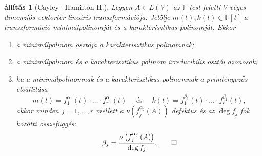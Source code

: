 \documentclass[9pt, a4paper, showtrims]{memoir}
\theoremstyle{plain}
\newtheorem{proposition}{állítás}[chapter]
\theoremstyle{remark}
\theoremstyle{definition}
\begin{document}
\begin{proposition}[Cayley\,--\,Hamilton II.]
    Legyen $A\in L\left( V \right)$ az $\mathbb{F}$ test feletti $V$ véges dimenziós vektortér
    lineáris transzformációja.
    Jelölje $m\left( t \right), k\left( t \right)\in\mathbb{F}\left[ t \right]$
    a transzformáció minimálpolinomját és a karakterisztikus polinomját.
    Ekkor
    \begin{enumerate}
        \item a minimálpolinom osztója a karakterisztikus polinomnak;
        \item a minimálpolinom és a karakterisztikus polinom irreducibilis osztói azonosak;
        \item ha a minimálpolinomnak és a karakterisztikus polinomnak a primtényezős előállítása
            \[
                m\left( t \right)
                =
                f_1^{\alpha_1}\left( t \right)
                \cdot\ldots\cdot
                f_r^{\alpha_r}\left( t \right)
                \quad\text{ és }\quad
                k\left( t \right)
                =
                f_1^{\beta_1}\left( t \right)
                \cdot\ldots\cdot
                f_r^{\beta_1}\left( t \right),
            \]
            akkor minden $j=1,\ldots,r$ mellett a $\nu\left( f_j^{\alpha_j} \left( A \right)\right)$ defektus
            és az $\deg f_j$ fok közötti összefüggés:
            \[
                \beta_j
                =
                \frac{\nu\left( f_j^{\alpha_j}\left( A \right) \right)}{\deg f_j}.
                \qedhere
            \]
    \end{enumerate}
\end{proposition}
\end{document}
